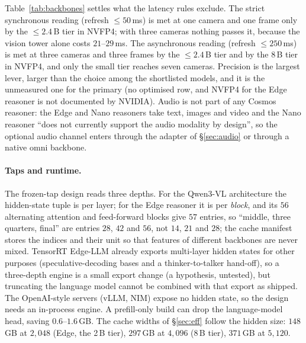 Table~\ref{tab:backbones} settles what the latency rules exclude. The strict synchronous reading (refresh $\le50$\,ms) is met at one camera and one frame only by the $\le2.4$\,B tier in NVFP4; with three cameras nothing passes it, because the vision tower alone costs $21$--$29$\,ms. The asynchronous reading (refresh $\le250$\,ms) is met at three cameras and three frames by the $\le2.4$\,B tier and by the 8\,B tier in NVFP4, and only the small tier reaches seven cameras. Precision is the largest lever, larger than the choice among the shortlisted models, and it is the unmeasured one for the primary (no optimised row, and NVFP4 for the Edge reasoner is not documented by NVIDIA).
Audio is not part of any Cosmos reasoner: the Edge and Nano reasoners take text, images and video and the Nano reasoner ``does not currently support the audio modality by design'', so the optional audio channel enters through the adapter of \S\ref{sec:audio} or through a native omni backbone.

\paragraph{Taps and runtime.}
The frozen-tap design reads three depths. For the Qwen3-VL architecture the hidden-state tuple is per layer; for the Edge reasoner it is per \emph{block}, and its $56$ alternating attention and feed-forward blocks give $57$ entries, so ``middle, three quarters, final'' are entries $28$, $42$ and $56$, not $14$, $21$ and $28$; the cache manifest stores the indices and their unit so that features of different backbones are never mixed. TensorRT Edge-LLM already exports multi-layer hidden states for other purposes (speculative-decoding bases and a thinker-to-talker hand-off), so a three-depth engine is a small export change (a hypothesis, untested), but truncating the language model cannot be combined with that export as shipped. The OpenAI-style servers (vLLM, NIM) expose no hidden state, so the design needs an in-process engine. A prefill-only build can drop the language-model head, saving $0.6$--$1.6$\,GB. The cache widths of \S\ref{sec:eff} follow the hidden size: $148$\,GB at $2{,}048$ (Edge, the 2\,B tier), $297$\,GB at $4{,}096$ (8\,B tier), $371$\,GB at $5{,}120$.

